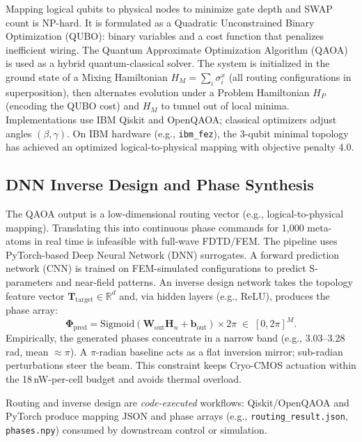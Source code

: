 \documentclass[11pt, a4paper]{article}
\begin{document}
Mapping logical qubits to physical nodes to minimize gate depth and SWAP count is NP-hard. It is formulated as a Quadratic Unconstrained Binary Optimization (QUBO): binary variables and a cost function that penalizes inefficient wiring. The Quantum Approximate Optimization Algorithm (QAOA) is used as a hybrid quantum-classical solver. The system is initialized in the ground state of a Mixing Hamiltonian $H_M = \sum_i \sigma_i^x$ (all routing configurations in superposition), then alternates evolution under a Problem Hamiltonian $H_P$ (encoding the QUBO cost) and $H_M$ to tunnel out of local minima. Implementations use IBM Qiskit and OpenQAOA; classical optimizers adjust angles $(\beta, \gamma)$. On IBM hardware (e.g., \texttt{ibm\_fez}), the 3-qubit minimal topology has achieved an optimized logical-to-physical mapping with objective penalty 4.0.

\subsection{DNN Inverse Design and Phase Synthesis}

The QAOA output is a low-dimensional routing vector (e.g., logical-to-physical mapping). Translating this into continuous phase commands for 1,000 meta-atoms in real time is infeasible with full-wave FDTD/FEM. The pipeline uses PyTorch-based Deep Neural Network (DNN) surrogates. A forward prediction network (CNN) is trained on FEM-simulated configurations to predict S-parameters and near-field patterns. An inverse design network takes the topology feature vector $\mathbf{T}_{\mathrm{target}} \in \mathbb{R}^d$ and, via hidden layers (e.g., ReLU), produces the phase array:
\begin{equation}
\boldsymbol{\Phi}_{\mathrm{pred}} = \mathrm{Sigmoid}(\mathbf{W}_{\mathrm{out}} \mathbf{H}_n + \mathbf{b}_{\mathrm{out}}) \times 2\pi \;\in\; [0,2\pi]^M.
\end{equation}
Empirically, the generated phases concentrate in a narrow band (e.g., 3.03--3.28\,rad, mean $\approx \pi$). A $\pi$-radian baseline acts as a flat inversion mirror; sub-radian perturbations steer the beam. This constraint keeps Cryo-CMOS actuation within the 18\,nW-per-cell budget and avoids thermal overload.

Routing and inverse design are \emph{code-executed} workflows: Qiskit/OpenQAOA and PyTorch produce mapping JSON and phase arrays (e.g., \texttt{routing\_result.json}, \texttt{phases.npy}) consumed by downstream control or simulation.
\end{document}
